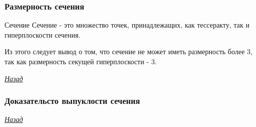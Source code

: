 \documentclass[10pt,pdf,hyperref={unicode}]{beamer}
\begin{document}
\begin{frame}
	\vspace{}
\end{frame}
\begin{frame}
	\frametitle{Размерность сечения}
	\hypertarget{basis}{}
	\begin{block}{Сечение}
		Сечение - это множество точек, принадлежащих, как тессеракту, так и гиперплоскости сечения.
	\end{block}
	Из этого следует вывод о том, что сечение не может иметь размерность более 3, так как размерность секущей гиперплоскости - 3. 

	{\raggedleft\vfill\itshape\Longstack[l]
	\hyperlink{basis_back}{Назад} \\
	}\par
	
\end{frame}
\begin{frame}
	\frametitle{Доказательсто выпуклости сечения}
	\hypertarget{vipuk}{}
	\begin{block}{}
	\end{block}

	{\raggedleft\vfill\itshape\Longstack[l]
	\hyperlink{vipuk_back}{Назад} \\
	}\par

		
\end{frame}
\end{document}
